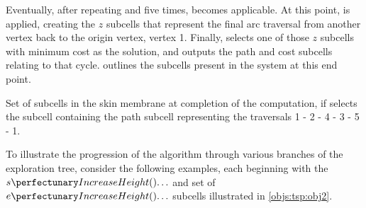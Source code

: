 Eventually, after repeating  and  five times,  becomes applicable.  At this point,  is applied, creating the \(z\) subcells that represent the final arc traversal from another vertex back to the origin vertex, vertex 1.  Finally,  selects one of those \(z\) subcells with minimum cost as the solution, and outputs the path and cost subcells relating to that cycle.   outlines the subcells present in the system at this end point.

\begin{cpobjectsfloat}
\begin{cpobjects}
\end{cpobjects}
\caption[Set of subcells in the skin membrane at completion of the computation]{\label{objs:tsp:obj4}Set of subcells in the skin membrane at completion of the computation, if  selects the subcell containing the path subcell representing the traversals 1 - 2 - 4 - 3 - 5 - 1.}
\end{cpobjectsfloat}

To illustrate the progression of the algorithm through various branches of the exploration tree, consider the following examples, each beginning with the \(\cpfunc{s}{\ldots}\) and set of \(\cpfunc{e}{\ldots}\) subcells illustrated in \cref{objs:tsp:obj2}.

